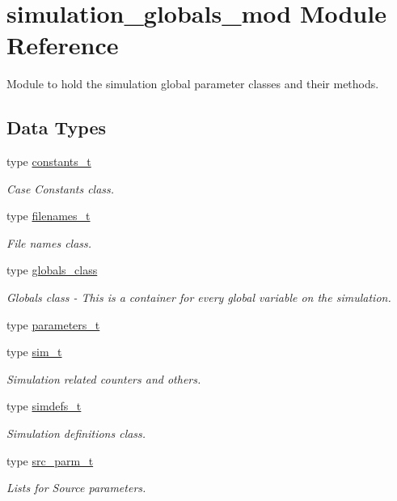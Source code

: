 \hypertarget{namespacesimulation__globals__mod}{}\section{simulation\+\_\+globals\+\_\+mod Module Reference}
\label{namespacesimulation__globals__mod}


Module to hold the simulation global parameter classes and their methods.  


\subsection*{Data Types}
\begin{DoxyCompactItemize}
\item 
type \mbox{\hyperlink{structsimulation__globals__mod_1_1constants__t}{constants\+\_\+t}}
\begin{DoxyCompactList}\small\item\em Case Constants class. \end{DoxyCompactList}\item 
type \mbox{\hyperlink{structsimulation__globals__mod_1_1filenames__t}{filenames\+\_\+t}}
\begin{DoxyCompactList}\small\item\em File names class. \end{DoxyCompactList}\item 
type \mbox{\hyperlink{structsimulation__globals__mod_1_1globals__class}{globals\+\_\+class}}
\begin{DoxyCompactList}\small\item\em Globals class -\/ This is a container for every global variable on the simulation. \end{DoxyCompactList}\item 
type \mbox{\hyperlink{structsimulation__globals__mod_1_1parameters__t}{parameters\+\_\+t}}
\item 
type \mbox{\hyperlink{structsimulation__globals__mod_1_1sim__t}{sim\+\_\+t}}
\begin{DoxyCompactList}\small\item\em Simulation related counters and others. \end{DoxyCompactList}\item 
type \mbox{\hyperlink{structsimulation__globals__mod_1_1simdefs__t}{simdefs\+\_\+t}}
\begin{DoxyCompactList}\small\item\em Simulation definitions class. \end{DoxyCompactList}\item 
type \mbox{\hyperlink{structsimulation__globals__mod_1_1src__parm__t}{src\+\_\+parm\+\_\+t}}
\begin{DoxyCompactList}\small\item\em Lists for Source parameters. \end{DoxyCompactList}\end{DoxyCompactItemize}
